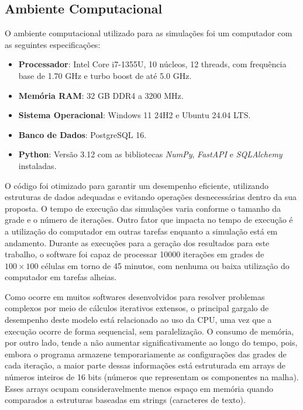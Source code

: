 \documentclass[12pt,oneside]{report}
\begin{document}

\subsection{Ambiente Computacional}
O ambiente computacional utilizado para as simulações foi um computador com as seguintes especificações:
\begin{itemize}
    \item \textbf{Processador}: Intel Core i7-1355U, 10 núcleos, 12 threads, com frequência base de 1.70 GHz e turbo boost de até 5.0 GHz.
    \item \textbf{Memória RAM}: 32 GB DDR4 a 3200 MHz.
    \item \textbf{Sistema Operacional}: Windows 11 24H2 e Ubuntu 24.04 LTS.
    \item \textbf{Banco de Dados}: PostgreSQL 16.
    \item \textbf{Python}: Versão 3.12 com as bibliotecas \textit{NumPy}, \textit{FastAPI} e \textit{SQLAlchemy} instaladas.
\end{itemize}

O código foi otimizado para garantir um desempenho eficiente, utilizando estruturas de dados adequadas e evitando operações desnecessárias dentro da sua proposta. O tempo de execução das simulações varia conforme o tamanho da grade e o número de iterações. Outro fator que impacta no tempo de execução é a utilização do computador em outras tarefas enquanto a simulação está em andamento. Durante as execuções para a geração dos resultados para este trabalho, o software foi capaz de processar 10000 iterações em grades de $100 \times 100$ células em torno de 45 minutos, com nenhuma ou baixa utilização do computador em tarefas alheias.

Como ocorre em muitos softwares desenvolvidos para resolver problemas complexos por meio de cálculos iterativos extensos, o principal gargalo de desempenho deste modelo está relacionado ao uso da CPU, uma vez que a execução ocorre de forma sequencial, sem paralelização. O consumo de memória, por outro lado, tende a não aumentar significativamente ao longo do tempo, pois, embora o programa armazene temporariamente as configurações das grades de cada iteração, a maior parte dessas informações está estruturada em arrays de números inteiros de 16 bits (números que representam os componentes na malha). Esses arrays ocupam consideravelmente menos espaço em memória quando comparados a estruturas baseadas em strings (caracteres de texto).
\end{document}
